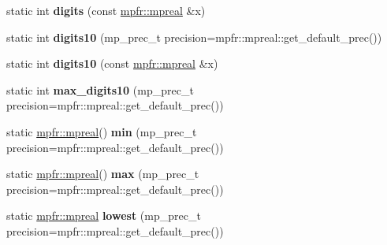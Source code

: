 \begin{DoxyCompactItemize}
static int {\bfseries digits} (const \hyperlink{classmpfr_1_1mpreal}{mpfr\+::mpreal} \&x)
\item 
\mbox{\label{classstd_1_1numeric__limits_3_01mpfr_1_1mpreal_01_4_a3ec324d8e12c98e0dcb7231db0e907c1}} 
static int {\bfseries digits10} (mp\+\_\+prec\+\_\+t precision=mpfr\+::mpreal\+::get\+\_\+default\+\_\+prec())
\item 
\mbox{\label{classstd_1_1numeric__limits_3_01mpfr_1_1mpreal_01_4_aec3df84a2ca0c42972490a0d05185b71}} 
static int {\bfseries digits10} (const \hyperlink{classmpfr_1_1mpreal}{mpfr\+::mpreal} \&x)
\item 
\mbox{\label{classstd_1_1numeric__limits_3_01mpfr_1_1mpreal_01_4_a6f91262332374ef656622ed298bf001e}} 
static int {\bfseries max\+\_\+digits10} (mp\+\_\+prec\+\_\+t precision=mpfr\+::mpreal\+::get\+\_\+default\+\_\+prec())
\item 
\mbox{\label{classstd_1_1numeric__limits_3_01mpfr_1_1mpreal_01_4_ae26e5f5575ce3fcdc7571353d5943447}} 
static \hyperlink{classmpfr_1_1mpreal}{mpfr\+::mpreal}() {\bfseries min} (mp\+\_\+prec\+\_\+t precision=mpfr\+::mpreal\+::get\+\_\+default\+\_\+prec())
\item 
\mbox{\label{classstd_1_1numeric__limits_3_01mpfr_1_1mpreal_01_4_af3b5798dea70eba7566b8558177c5cb7}} 
static \hyperlink{classmpfr_1_1mpreal}{mpfr\+::mpreal}() {\bfseries max} (mp\+\_\+prec\+\_\+t precision=mpfr\+::mpreal\+::get\+\_\+default\+\_\+prec())
\item 
\mbox{\label{classstd_1_1numeric__limits_3_01mpfr_1_1mpreal_01_4_afe87477420320b20ef726e383e06a950}} 
static \hyperlink{classmpfr_1_1mpreal}{mpfr\+::mpreal} {\bfseries lowest} (mp\+\_\+prec\+\_\+t precision=mpfr\+::mpreal\+::get\+\_\+default\+\_\+prec())
\item 
\mbox{\label{classstd_1_1numeric__limits_3_01mpfr_1_1mpreal_01_4_ac2f7a8222ef4b03518ad0a3e247b0ff6}} 

\end{DoxyCompactItemize}
